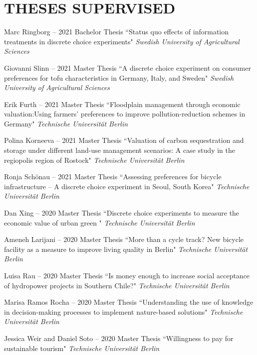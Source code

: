 \documentclass[paper=a4,fontsize=11pt]{scrartcl} %
\newcommand{\NewPart}[2]{\section*{\uppercase{#1} #2}}
\newcommand{\ThesisEntry}[5]{
		\noindent #1 -- #2 #3 ``#4" \textit{#5}}
\begin{document}
\NewPart{Theses Supervised}{}
\begin{etaremune}

\item \ThesisEntry{Marc Ringborg}{2021}{Bachelor Thesis}{Status quo effects of information treatments in discrete choice experiments}{Swedish University of Agricultural Sciences}

\item \ThesisEntry{Giovanni Slinn}{2021}{Master Thesis}{A discrete choice experiment on consumer preferences for tofu characteristics in Germany, Italy, and Sweden}{Swedish University of Agricultural Sciences}

\item \ThesisEntry{Erik Furth}{2021}{Master Thesis}{Floodplain management through economic valuation:Using farmers' preferences to improve pollution-reduction schemes in Germany}{Technische Universität Berlin}

\item \ThesisEntry{Polina Korneeva}{2021}{Master Thesis}{Valuation of carbon sequestration and storage under different land-use management scenarios: A case study in the regiopolis region of Rostock}{Technische Universität Berlin}

\item \ThesisEntry{Ronja Schönau}{2021}{Master Thesis}{Assessing preferences for bicycle infrastructure –
A discrete choice experiment in Seoul, South Korea}{Technische Universität Berlin}

\item \ThesisEntry{Dan Xing}{2020}{Master Thesis}{Discrete choice experiments to measure the economic value of urban green }{Technische Universität Berlin}

\item \ThesisEntry{Ameneh Larijani}{2020}{Master Thesis}{More than a cycle track? New bicycle facility as a measure to improve living quality in Berlin}{Technische Universität Berlin}

\item \ThesisEntry{Luisa Rau}{2020}{Master Thesis}{Is money enough to increase social acceptance of hydropower projects in Southern Chile?}{Technische Universität Berlin}

\item \ThesisEntry{Marisa Ramos Rocha}{2020}{Master Thesis}{Understanding the use of knowledge in decision-making processes to implement nature-based solutions}{Technische Universität Berlin}

\item \ThesisEntry{Jessica Weir and Daniel Soto}{2020}{Master Thesis}{Willingness to pay for sustainable tourism}{Technische Universität Berlin}


\end{etaremune}
\end{document}
